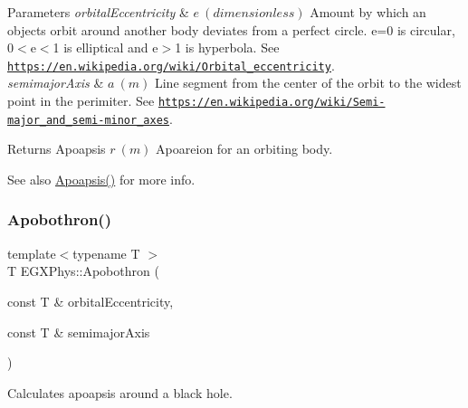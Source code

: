 \begin{DoxyParams}{Parameters}
{\em orbital\+Eccentricity} & $ e\ (dimensionless)$ Amount by which an objects orbit around another body deviates from a perfect circle. e=0 is circular, 0$<$e$<$1 is elliptical and e$>$1 is hyperbola. See \href{https://en.wikipedia.org/wiki/Orbital_eccentricity}{\tt https\+://en.\+wikipedia.\+org/wiki/\+Orbital\+\_\+eccentricity}. \\
\hline
{\em semimajor\+Axis} & $ a\ (m)$ Line segment from the center of the orbit to the widest point in the perimiter. See \href{https://en.wikipedia.org/wiki/Semi-major_and_semi-minor_axes}{\tt https\+://en.\+wikipedia.\+org/wiki/\+Semi-\/major\+\_\+and\+\_\+semi-\/minor\+\_\+axes}. \\
\hline
\end{DoxyParams}
\begin{DoxyReturn}{Returns}
Apoapsis $ r\ (m)$ Apoareion for an orbiting body. 
\end{DoxyReturn}
\begin{DoxySeeAlso}{See also}
\mbox{\hyperlink{group___e_g_x_phys-_apoapsis_gaf962e650bf84a568458e8eb39b1c61ba}{Apoapsis()}} for more info. 
\end{DoxySeeAlso}
\mbox{\label{group___e_g_x_phys-_apoapsis_ga6fe084b9e69f47a5032b05aa8f6bf7ad}} 
\subsubsection{\texorpdfstring{Apobothron()}{Apobothron()}}
{\footnotesize\ttfamily template$<$typename T $>$ \\
T E\+G\+X\+Phys\+::\+Apobothron (\begin{DoxyParamCaption}\item[{const T \&}]{orbital\+Eccentricity,  }\item[{const T \&}]{semimajor\+Axis }\end{DoxyParamCaption})}



Calculates apoapsis around a black hole. 


